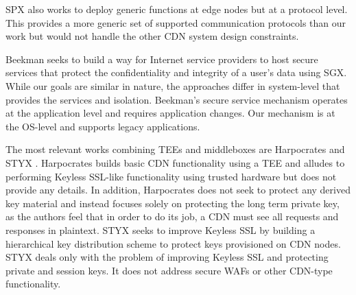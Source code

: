 SPX \cite{bhardwaj2018spx} also works to deploy generic functions at edge nodes but at a protocol level.
This provides a more generic set of supported communication protocols than our work but would not handle the other CDN system design constraints.

Beekman \cite{beekman2016improving} seeks to build a way for Internet service providers to host secure services that protect the confidentiality and integrity of a user's data using SGX.  While our goals are similar in nature, the approaches differ in system-level that provides the services and isolation.  Beekman's secure service mechanism operates at the application level and requires application changes.  Our mechanism is at the OS-level and supports legacy applications.

The most relevant works combining TEEs and middleboxes are Harpocrates \cite{ahmed2018harpocrates} and STYX \cite{wei2017styx}.
Harpocrates builds basic CDN functionality using a TEE and alludes to performing Keyless SSL-like functionality using trusted hardware but does not provide any details.  In addition, Harpocrates does not seek to protect any derived key material and instead focuses solely on protecting the long term private key, as the authors feel that in order to do its job, a CDN must see all requests and responses in plaintext.
STYX seeks to improve Keyless SSL by building a hierarchical key distribution scheme to protect keys provisioned on CDN nodes.  STYX deals only with the problem of improving Keyless SSL and protecting private and session keys.  It does not address secure WAFs or other CDN-type functionality.





